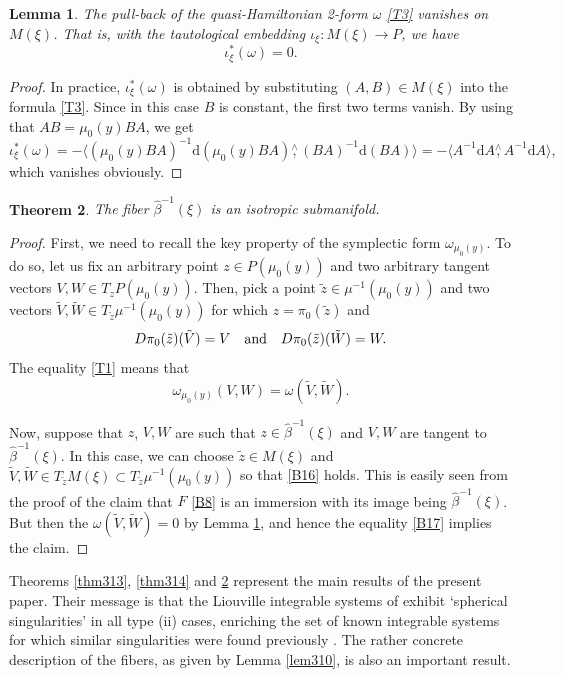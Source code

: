 \documentclass[a4paper,11pt,reqno]{amsart}
\newtheorem{thm}{Theorem}[section]
\newtheorem{lem}[thm]{Lemma}
\theoremstyle{definition}
\numberwithin{equation}{section}
\newcommand{\be}{\begin{equation}}
\newcommand{\ee}{\end{equation}}
\begin{document}
\begin{lem}\label{lem315}
The pull-back of the quasi-Hamiltonian 2-form $\omega$ \eqref{T3} vanishes on $M(\xi)$.
That is, with the tautological embedding $\iota_\xi: M(\xi) \to P$, we have
\be
\iota_\xi^* (\omega) =0.
\ee
\end{lem}
\begin{proof}
In practice, $\iota_\xi^*(\omega)$ is obtained by substituting $(A,B) \in M(\xi)$ into the
formula \eqref{T3}. Since in this case $B$ is constant, the first two terms vanish. By using that
$AB = \mu_0(y) BA$, we get
\be
\iota_\xi^*(\omega) = - \langle (\mu_0(y) BA)^{-1} \mathrm{d} (\mu_0(y) BA) \stackrel{\wedge}{,} (BA)^{-1} \mathrm{d} (BA)
\rangle = - \langle A^{-1} \mathrm{d} A \stackrel{\wedge}{,} A^{-1} \mathrm{d} A \rangle,
\label{G29}\ee
which vanishes obviously.
\end{proof}



\begin{thm}\label{thm316}
 The fiber $\hat \beta^{-1}(\xi)$ is an isotropic submanifold.
\end{thm}
\begin{proof}
First, we need to recall the key property of the symplectic form $\omega_{\mu_0(y)}$.
To do so,  let us fix an arbitrary point $z\in P(\mu_0(y))$ and two arbitrary tangent vectors $V, W \in T_z P(\mu_0(y))$.
Then, pick a point $\tilde z \in \mu^{-1}(\mu_0(y))$ and two vectors $\tilde V, \tilde W \in T_{\tilde z} \mu^{-1}(\mu_0(y))$
for which $z= \pi_0(\tilde z)$ and
\be
D\pi_0(\tilde z)(\tilde V) = V
\quad \hbox{and}\quad
D\pi_0(\tilde z)(\tilde W) = W.
\label{B16}\ee
The equality \eqref{T1} means that
\be
\omega_{\mu_0(y)} (V, W) = \omega(\tilde V, \tilde W).
\label{B17}\ee

Now, suppose that $z$, $V,W$ are such that $z\in \hat \beta^{-1}(\xi)$ and $V,W$ are tangent to $\hat \beta^{-1}(\xi)$.
In this case, we can choose $\tilde z\in M(\xi)$ and $\tilde V, \tilde W \in T_{\tilde z} M(\xi) \subset T_{\tilde z} \mu^{-1}(\mu_0(y))$
so that \eqref{B16} holds.
This is easily seen from the proof of the claim that $F$ \eqref{B8} is an immersion with its image being $\hat \beta^{-1}(\xi)$.
But then the $\omega(\tilde V, \tilde W)=0$ by Lemma \ref{lem315},  and hence the equality \eqref{B17} implies the claim.
\end{proof}


Theorems \ref{thm313}, \ref{thm314} and \ref{thm316} represent the main results of the present paper.
Their message is that the Liouville integrable systems of \cite{FK} exhibit `spherical singularities'
in all  type (ii) cases,
enriching the set of known integrable systems for which similar singularities were found previously \cite{B,BMZ,CK,CKO,K, NU-pol, NU}.
The rather concrete description
of the fibers, as given by Lemma \ref{lem310}, is also an important result.
\end{document}
